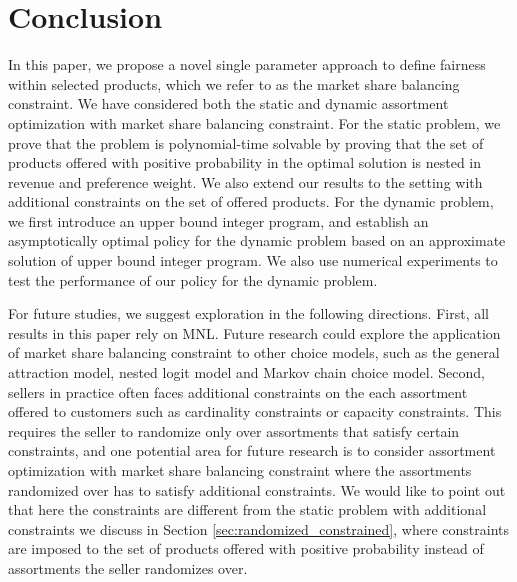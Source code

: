 \documentclass[mnsc,non-blindrev]{informs3}
\theoremstyle{definition}
\begin{document}
\section{Conclusion}

In this paper, we propose a novel single parameter approach to define fairness within selected products, which we refer to as the market share balancing constraint. We have considered both the static and dynamic assortment optimization with market share balancing constraint. For the static problem, we prove that the problem is polynomial-time solvable by proving that the set of products offered with positive probability in the optimal solution is nested in revenue and preference weight. We also extend our results to the setting with additional constraints on the set of offered products. For the dynamic problem, we first introduce an upper bound integer program, and establish an asymptotically optimal policy for the dynamic problem based on an approximate solution of upper bound integer program. We also use numerical experiments to test the performance of our policy for the dynamic problem.

For future studies, we suggest exploration in the following directions. First, all results in this paper rely on MNL. Future research could explore the application of market share balancing constraint to other choice models, such as the general attraction model, nested logit model and Markov chain choice model. Second, sellers in practice often faces additional constraints on the each assortment offered to customers such as cardinality constraints or capacity constraints. This requires the seller to randomize only over assortments that satisfy certain constraints, and one potential area for future research is to consider assortment optimization with market share balancing constraint where the assortments randomized over has to satisfy additional constraints. We would like to point out that here the constraints are different from the static problem with additional constraints we discuss in Section \ref{sec:randomized_constrained}, where constraints are imposed to the set of products offered with positive probability instead of assortments the seller randomizes over.



\vspace{-2mm}

{\SingleSpacedXI
%

}
\end{document}
